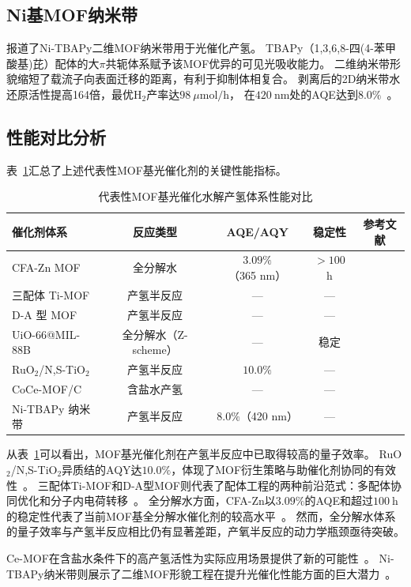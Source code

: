 
\subsection{Ni基MOF纳米带}

\citet{ni_tbpy_2020}报道了Ni-TBAPy二维MOF纳米带用于光催化产氢。 %
TBAPy（1,3,6,8-四(4-苯甲酸基)芘）配体的大$\pi$共轭体系赋予该MOF优异的可见光吸收能力。
二维纳米带形貌缩短了载流子向表面迁移的距离，有利于抑制体相复合。
剥离后的2D纳米带水还原活性提高164倍，最优H$_2$产率达$98~\mu\mathrm{mol/h}$，
在$420~\mathrm{nm}$处的AQE达到$8.0\%$~\citep{ni_tbpy_2020}。 %


\subsection{性能对比分析}

表~\ref{tab:performance_comparison}汇总了上述代表性MOF基光催化剂的关键性能指标。

\begin{table}[htbp]
\centering
\caption{代表性MOF基光催化水解产氢体系性能对比}
\label{tab:performance_comparison}
\begin{tabular}{lcccc}
\toprule
催化剂体系 & 反应类型 & AQE/AQY & 稳定性 & 参考文献 \\
\midrule
CFA-Zn MOF & 全分解水 & $3.09\%$（365 nm） & $>100$ h & \citep{cfazn2025ows} \\
三配体 Ti-MOF & 产氢半反应 & --- & --- & \citep{liu2024three_ligand_timof} \\
D-A 型 MOF & 产氢半反应 & --- & --- & \citep{yan2023donor_acceptor_mof} \\
UiO-66@MIL-88B & 全分解水（Z-scheme） & --- & 稳定 & \citep{uio66_mil88b_2024} \\
RuO$_2$/N,S-TiO$_2$ & 产氢半反应 & $10.0\%$ & --- & \citep{rtta2024heterojunction} \\
CoCe-MOF/C & 含盐水产氢 & --- & --- & \citep{coce_mof_2025} \\
Ni-TBAPy 纳米带 & 产氢半反应 & $8.0\%$（420 nm） & --- & \citep{ni_tbpy_2020} \\
\bottomrule
\end{tabular}
\end{table}

从表~\ref{tab:performance_comparison}可以看出，MOF基光催化剂在产氢半反应中已取得较高的量子效率。
RuO$_2$/N,S-TiO$_2$异质结的AQY达$10.0\%$，体现了MOF衍生策略与助催化剂协同的有效性~\citep{rtta2024heterojunction}。 %
三配体Ti-MOF和D-A型MOF则代表了配体工程的两种前沿范式：多配体协同优化和分子内电荷转移~\citep{liu2024three_ligand_timof,yan2023donor_acceptor_mof}。 %
全分解水方面，CFA-Zn以$3.09\%$的AQE和超过$100~\mathrm{h}$的稳定性代表了当前MOF基全分解水催化剂的较高水平~\citep{cfazn2025ows}。 %
然而，全分解水体系的量子效率与产氢半反应相比仍有显著差距，产氧半反应的动力学瓶颈亟待突破。

Ce-MOF在含盐水条件下的高产氢活性为实际应用场景提供了新的可能性~\citep{coce_mof_2025}。 %
Ni-TBAPy纳米带则展示了二维MOF形貌工程在提升光催化性能方面的巨大潜力~\citep{ni_tbpy_2020}。 %
